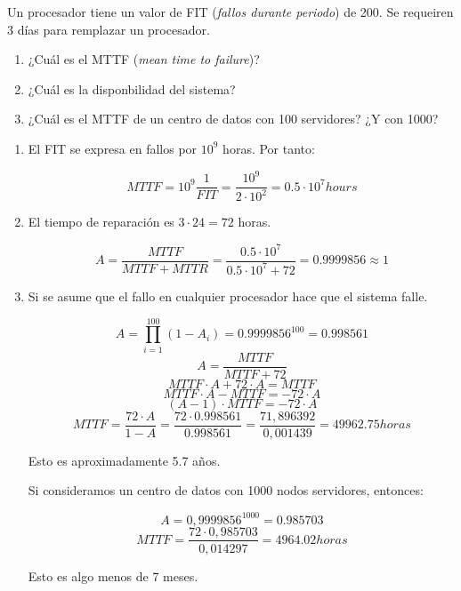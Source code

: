 \begin{acexercise}\end{acexercise}

Un procesador tiene un valor de FIT (\emph{fallos durante periodo}) de 200.
Se requeiren 3 días para remplazar un procesador.

\begin{enumerate}

\item ¿Cuál es el MTTF (\emph{mean time to failure})?

\item ¿Cuál es la disponbilidad del sistema?

\item ¿Cuál es el MTTF de un centro de datos con 100 servidores? ¿Y con 1000?

\end{enumerate}

\begin{acsolution}\end{acsolution}

\begin{enumerate}

\item El FIT se expresa en fallos por $10^9$ horas. Por tanto:

\[MTTF = 10^9 \frac{1}{FIT} = \frac{10^9}{2 \cdot 10^2} = 0.5 \cdot 10^7 hours\]

\item El tiempo de reparación es $3 \cdot 24 = 72$ horas.

\[
A = \frac{MTTF}{MTTF + MTTR} =
\frac{0.5 \cdot 10^7}{0.5 \cdot 10^7 + 72} =
0.9999856 \approx 1
\]

\item Si se asume que el fallo en cualquier procesador hace que el sistema falle.

\[
A = \prod_{i=1}^{100}(1 - A_i) = 0.9999856^{100} = 0.998561
\]
\[A = \frac{MTTF}{MTTF + 72} \]
\[MTTF \cdot A + 72 \cdot A = MTTF\]
\[MTTF \cdot A - MTTF = - 72 \cdot A\]
\[(A-1) \cdot MTTF = - 72 \cdot A\]
\[MTTF = \frac{72 \cdot A}{1 - A} = \frac{72 \cdot 0.998561}{0.998561} =
\frac{71,896392}{0,001439} =
49962.75 horas
\]

Esto es aproximadamente 5.7 años.

Si consideramos un centro de datos con 1000 nodos servidores, entonces:

\[A = 0,9999856^{1000} = 0.985703\]
\[MTTF = \frac{72 \cdot 0,985703}{0,014297} = 4964.02 horas\]

Esto es algo menos de 7 meses.

\end{enumerate}


